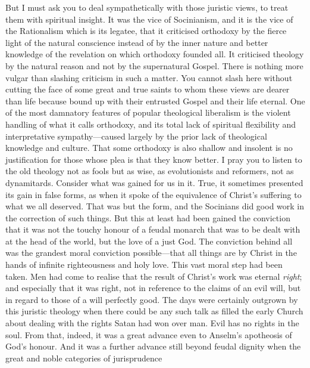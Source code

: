 \documentclass[12pt,a5paper,twoside,titlepage]{book}
\begin{document}
But I must ask you to deal sympathetically 
with those juristic views, to treat them with 
spiritual insight. It was the vice of Socinianism, 
and it is the vice of the Rationalism which is its 
legatee, that it criticised orthodoxy by the fierce 
light of the natural conscience instead of by the 
inner nature and better knowledge of the revelation 
on which orthodoxy founded all. It criticised 
theology by the natural reason and not by 
the supernatural Gospel. There is nothing more 
vulgar than slashing criticism in such a matter. 
You cannot slash here without cutting the face 
of some great and true saints to whom these 
views are dearer than life because bound up 
with their entrusted Gospel and their life 
eternal. One of the most damnatory features 
of popular theological liberalism is the violent 
handling of what it calls orthodoxy, and its 
total lack of spiritual flexibility and interpretative 
sympathy---caused largely by the prior 
lack of theological knowledge and culture. 
That some orthodoxy is also shallow and insolent 
is no justification for those whose plea 
is that they know better. I pray you to listen 
to the old theology not as fools but as wise, 
as evolutionists and reformers, not as dynamitards. 
Consider what was gained for us in 
it. True, it sometimes presented its gain in 
false forms, as when it spoke of the equivalence 
of Christ's suffering to what we all deserved. 
That was but the form, and the Socinians did good 
work in the correction of such things. But this 
at least had been gained the conviction that it 
was not the touchy honour of a feudal monarch 
that was to be dealt with at the head of the 
world, but the love of a just God. The conviction 
behind all was the grandest moral conviction 
possible---that all things are by Christ in the 
hands of infinite righteousness and holy love. 
This vast moral step had been taken. Men had 
come to realise that the result of Christ's work 
was eternal \textit{right}; and especially that it was 
right, not in reference to the claims of an evil 
will, but in regard to those of a will perfectly 
good. The days were certainly outgrown by this 
juristic theology when there could be any such 
talk as filled the early Church about dealing 
with the rights Satan had won over man. 
Evil has no rights in the soul. From that, indeed, 
it was a great advance even to Anselm's 
apotheosis of God's honour. And it was a 
further advance still beyond feudal dignity 
when the great and noble categories of jurisprudence 
\end{document}
